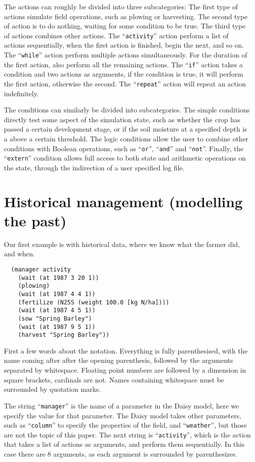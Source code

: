 \documentclass[a4paper]{article}
\newcommand{\dname}[1]{``\texttt{#1}''}
\begin{document}
The actions can roughly be divided into three subcategories: The first
type of actions simulate field operations, such as plowing or
harvesting.  The second type of action is to do nothing, waiting for
some condition to be true.  The third type of actions combines other
actions.  The \dname{activity} action perform a list of actions
sequentially, when the first action is finished, begin the next, and
so on.  The \dname{while} action perform multiple actions
simultaneously.  For the duration of the first action, also perform
all the remaining actions.  The \dname{if} action takes a condition
and two actions as arguments, if the condition is true, it will
perform the first action, otherwise the second.  The \dname{repeat}
action will repeat an action indefinitely.

The conditions can similarly be divided into subcategories.  The
simple conditions directly test some aspect of the simulation state,
such as whether the crop has passed a certain development stage, or
if the soil moisture at a specified depth is a above a certain
threshold.  The logic conditions allow the user to combine other
conditions with Boolean operations, such as \dname{or}, \dname{and}
and \dname{not}.  Finally, the \dname{extern} condition allows full
access to both state and arithmetic operations on the state, through
the indirection of a user specified log file.

\section{Historical management (modelling the past)}

Our first example is with historical data, where we know what the
farmer did, and when.
\begin{verbatim}
  (manager activity
    (wait (at 1987 3 20 1))
    (plowing)
    (wait (at 1987 4 4 1))
    (fertilize (N25S (weight 100.0 [kg N/ha])))
    (wait (at 1987 4 5 1))
    (sow "Spring Barley")
    (wait (at 1987 9 5 1))
    (harvest "Spring Barley"))
\end{verbatim}

First a few words about the notation.  Everything is fully
parenthesised, with the name coming after after the opening
parenthesis, followed by the arguments separated by whitespace.
Floating point numbers are followed by a dimension in square brackets,
cardinals are not.  Names containing whitespace must be surrounded
by quotation marks.

The string \dname{manager} is the name of a parameter in the Daisy
model, here we specify the value for that parameter.  The Daisy model
takes other parameters, such as \dname{column} to specify the
properties of the field, and \dname{weather}, but those are not the
topic of this paper.  The next string is \dname{activity}, which is
the action that takes a list of actions as arguments, and perform them
sequentially.  In this case there are 8 arguments, as each argument is
surrounded by parenthesizes.
\end{document}
